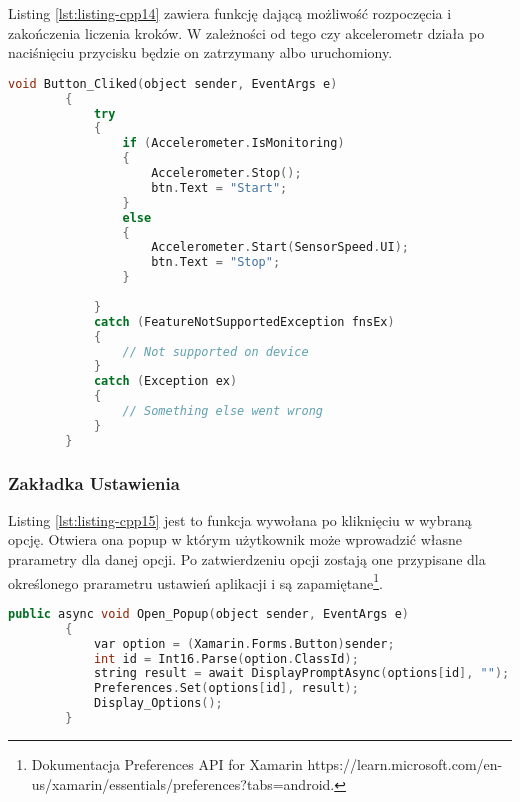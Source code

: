 	Listing \ref{lst:listing-cpp14} zawiera funkcję dającą możliwość rozpoczęcia i zakończenia liczenia kroków. W zależności od tego czy akcelerometr działa po naciśnięciu przycisku będzie on zatrzymany albo uruchomiony.
	\begin{lstlisting}[caption=Rozpoczęcia i zakończenie liczenia kroków, label={lst:listing-cpp14}, language=C++]
		void Button_Cliked(object sender, EventArgs e) 
		{
			try
			{
				if (Accelerometer.IsMonitoring)
				{
					Accelerometer.Stop();
					btn.Text = "Start";
				}   
				else
				{
					Accelerometer.Start(SensorSpeed.UI);
					btn.Text = "Stop";
				}
				
			}
			catch (FeatureNotSupportedException fnsEx)
			{
				// Not supported on device
			}
			catch (Exception ex)
			{
				// Something else went wrong
			}
		}
	\end{lstlisting}
	
	\subsubsection{Zakładka Ustawienia} %
	
	\hspace{0.60cm}Listing \ref{lst:listing-cpp15} jest to funkcja wywołana po kliknięciu w wybraną opcję. Otwiera ona popup w którym użytkownik może wprowadzić własne prarametry dla danej opcji. Po zatwierdzeniu opcji zostają one przypisane dla określonego prarametru ustawień aplikacji i są zapamiętane\footnote{Dokumentacja Preferences API for Xamarin   https://learn.microsoft.com/en-us/xamarin/essentials/preferences?tabs=android\cite{www7}.}.
	\begin{lstlisting}[caption=Otwarcie popup do wprowadzenia danych, label={lst:listing-cpp15}, language=C++]
		public async void Open_Popup(object sender, EventArgs e)
		{
			var option = (Xamarin.Forms.Button)sender;
			int id = Int16.Parse(option.ClassId);
			string result = await DisplayPromptAsync(options[id], "");
			Preferences.Set(options[id], result);
			Display_Options();
		}
	\end{lstlisting}
	
